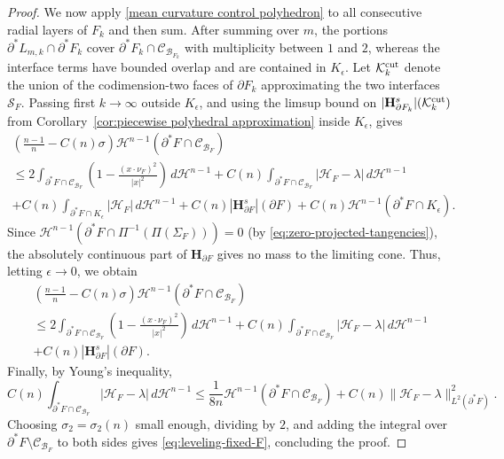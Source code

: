 \documentclass[reqno,11pt]{amsart}
\def\ez{\epsilon}
\def\sz{\sigma}
\newcommand{\HH}{\mathscr H}
\numberwithin{equation}{section}
\theoremstyle{remark}
\begin{document}
\begin{proof}
We now apply \eqref{mean curvature control polyhedron} to all consecutive radial
layers of $F_k$ and then sum. After summing over $m$, the portions
$\partial^*L_{m,k}\cap\partial^*F_k$ cover
$\partial^*F_k\cap\mathcal C_{\mathcal B_{F_k}}$ with multiplicity between
$1$ and $2$, whereas the interface terms have bounded overlap and are contained in
$K_\ez$. Let $\mathcal K_k^{\rm cut}$ denote the union of the
codimension-two faces of $\partial F_k$ approximating the two interfaces
$\mathcal S_F$. Passing first $k\to\infty$ outside $K_\ez$, and using the
limsup bound on
$|\mathbf H^s_{\partial F_k}|(\mathcal K_k^{\rm cut})$ from
Corollary~\ref{cor:piecewise polyhedral approximation} inside $K_\ez$, gives
\begin{multline*}
\left(\frac{n-1}{n}-C(n)\sz\right)
\HH^{n-1}(\partial^*F\cap\mathcal C_{\mathcal B_F})\\
\le
2\int_{\partial^*F\cap\mathcal C_{\mathcal B_F}}
\left(1-\frac{(x\cdot\nu_F)^2}{|x|^2}\right)\,d\HH^{n-1}
+C(n)\int_{\partial^*F\cap\mathcal C_{\mathcal B_F}}
|\mathcal H_F-\lambda|\,d\HH^{n-1}\\
+C(n)\int_{\partial^*F\cap K_\ez}|\mathcal H_F|\,d\HH^{n-1}
+C(n)|\mathbf H^s_{\partial F}|(\partial F)
+C(n)\HH^{n-1}(\partial^*F\cap K_\ez).
\end{multline*}
Since 
$\HH^{n-1}(\partial^*F\cap\Pi^{-1}(\Pi(\Sigma_F)))=0$ (by \eqref{eq:zero-projected-tangencies}), the
absolutely continuous part of $\mathbf H_{\partial F}$ gives no mass to the
limiting cone.
Thus, letting $\ez\to0$, we obtain
\begin{multline}\label{mean curvature control H}
\left(\frac{n-1}{n}-C(n)\sz\right)
\HH^{n-1}(\partial^*F\cap\mathcal C_{\mathcal B_F})\\
\le
2\int_{\partial^*F\cap\mathcal C_{\mathcal B_F}}
\left(1-\frac{(x\cdot\nu_F)^2}{|x|^2}\right)\,d\HH^{n-1}
+C(n)\int_{\partial^*F\cap\mathcal C_{\mathcal B_F}}
|\mathcal H_F-\lambda|\,d\HH^{n-1}\\
+C(n)|\mathbf H^s_{\partial F}|(\partial F).
\end{multline}
Finally, by Young's
inequality,
$$
C(n)\int_{\partial^*F\cap\mathcal C_{\mathcal B_F}}|\mathcal H_F-\lambda|\,d\HH^{n-1}
\le
\frac1{8n}\HH^{n-1}(\partial^*F\cap\mathcal C_{\mathcal B_F})
+C(n)\|\mathcal H_F-\lambda\|_{L^2(\partial^*F)}^2.
$$
Choosing $\sz_2=\sz_2(n)$ small enough, dividing by $2$, and adding the integral over
$\partial^*F\setminus\mathcal C_{\mathcal B_F}$ to both sides gives
\eqref{eq:leveling-fixed-F}, concluding the proof.
\end{proof}
\end{document}
